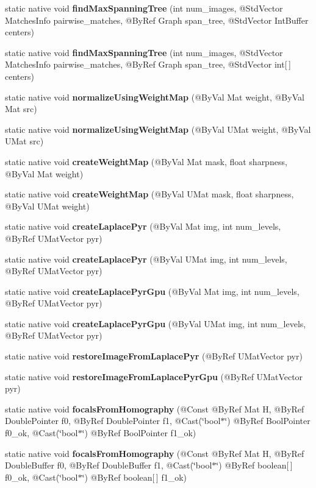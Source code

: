 \begin{DoxyCompactItemize}
\item 
static native void {\bfseries find\+Max\+Spanning\+Tree} (int num\+\_\+images, @Std\+Vector Matches\+Info pairwise\+\_\+matches, @By\+Ref Graph span\+\_\+tree, @Std\+Vector Int\+Buffer centers)
\item 
static native void {\bfseries find\+Max\+Spanning\+Tree} (int num\+\_\+images, @Std\+Vector Matches\+Info pairwise\+\_\+matches, @By\+Ref Graph span\+\_\+tree, @Std\+Vector int\mbox{[}$\,$\mbox{]} centers)
\item 
static native void {\bfseries normalize\+Using\+Weight\+Map} (@By\+Val Mat weight, @By\+Val Mat src)
\item 
static native void {\bfseries normalize\+Using\+Weight\+Map} (@By\+Val U\+Mat weight, @By\+Val U\+Mat src)
\item 
static native void {\bfseries create\+Weight\+Map} (@By\+Val Mat mask, float sharpness, @By\+Val Mat weight)
\item 
static native void {\bfseries create\+Weight\+Map} (@By\+Val U\+Mat mask, float sharpness, @By\+Val U\+Mat weight)
\item 
static native void {\bfseries create\+Laplace\+Pyr} (@By\+Val Mat img, int num\+\_\+levels, @By\+Ref U\+Mat\+Vector pyr)
\item 
static native void {\bfseries create\+Laplace\+Pyr} (@By\+Val U\+Mat img, int num\+\_\+levels, @By\+Ref U\+Mat\+Vector pyr)
\item 
static native void {\bfseries create\+Laplace\+Pyr\+Gpu} (@By\+Val Mat img, int num\+\_\+levels, @By\+Ref U\+Mat\+Vector pyr)
\item 
static native void {\bfseries create\+Laplace\+Pyr\+Gpu} (@By\+Val U\+Mat img, int num\+\_\+levels, @By\+Ref U\+Mat\+Vector pyr)
\item 
static native void {\bfseries restore\+Image\+From\+Laplace\+Pyr} (@By\+Ref U\+Mat\+Vector pyr)
\item 
static native void {\bfseries restore\+Image\+From\+Laplace\+Pyr\+Gpu} (@By\+Ref U\+Mat\+Vector pyr)
\item 
static native void {\bfseries focals\+From\+Homography} (@Const @By\+Ref Mat H, @By\+Ref Double\+Pointer f0, @By\+Ref Double\+Pointer f1, @Cast(\char`\"{}bool$\ast$\char`\"{}) @By\+Ref Bool\+Pointer f0\+\_\+ok, @Cast(\char`\"{}bool$\ast$\char`\"{}) @By\+Ref Bool\+Pointer f1\+\_\+ok)
\item 
static native void {\bfseries focals\+From\+Homography} (@Const @By\+Ref Mat H, @By\+Ref Double\+Buffer f0, @By\+Ref Double\+Buffer f1, @Cast(\char`\"{}bool$\ast$\char`\"{}) @By\+Ref boolean\mbox{[}$\,$\mbox{]} f0\+\_\+ok, @Cast(\char`\"{}bool$\ast$\char`\"{}) @By\+Ref boolean\mbox{[}$\,$\mbox{]} f1\+\_\+ok)

\end{DoxyCompactItemize}
